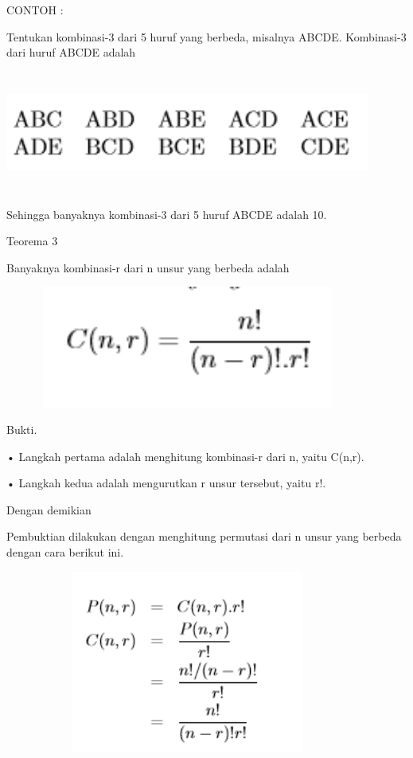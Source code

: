 \documentclass[11pt,fleqn]{book} %
\begin{document}
CONTOH :

Tentukan kombinasi-3 dari 5 huruf yang berbeda, misalnya ABCDE.
Kombinasi-3 dari huruf ABCDE adalah

\includegraphics[width = 12cm, height= 4cm]{Pictures/herlin5.png}

Sehingga banyaknya kombinasi-3 dari 5 huruf ABCDE adalah 10.

Teorema 3

Banyaknya kombinasi-r dari n unsur yang berbeda adalah

\includegraphics[width = 12cm, height= 4cm]{Pictures/herlin6.png}

Bukti.

• Langkah pertama adalah menghitung kombinasi-r dari n, yaitu C(n,r). 


• Langkah kedua adalah mengurutkan r unsur tersebut, yaitu r!.

 Dengan demikian
 
 
Pembuktian dilakukan dengan menghitung permutasi dari n unsur yang berbeda dengan cara berikut ini.

\includegraphics[width = 12cm, height= 6cm]{Pictures/herlin7.png}
\end{document}
